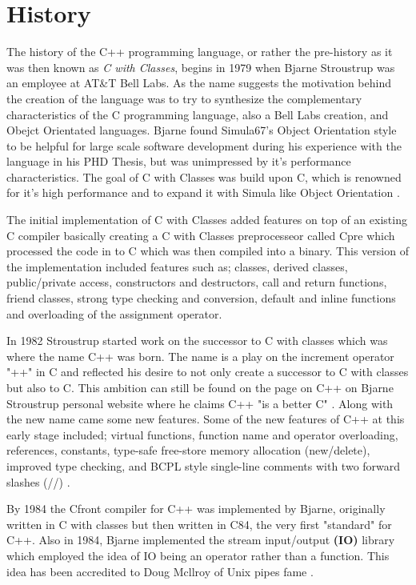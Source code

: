 \documentclass[conference, a4paper]{IEEEtran}
\begin{document}
\section{History}

The history of the C++ programming language, or rather the pre-history as it was then known as \textit{C with Classes}, begins in 1979 when Bjarne Stroustrup was an employee at AT\&T Bell Labs. As the name suggests the motivation behind the creation of the language was to try to synthesize the complementary characteristics of the C programming language, also a Bell Labs creation, and Obejct Orientated languages. Bjarne found Simula67's Object Orientation style to be helpful for large scale software development during his experience with the language in his PHD Thesis, but was unimpressed by it's performance characteristics. The goal of C with Classes was build upon C, which is renowned for it's high performance and to expand it with Simula like Object Orientation \cite{cppevolving}.

The initial implementation of C with Classes added features on top of an existing C compiler basically creating a C with Classes preprocesseor called Cpre which processed the code in to C which was then compiled into a binary. This version of the implementation included features such as; classes, derived classes, public/private access, constructors and destructors, call and return functions, friend classes, strong type checking and conversion, default and inline functions and overloading of the assignment operator. 

In 1982 Stroustrup started work on the successor to C with classes which was where the name C++ was born. The name is a play on the increment operator "++" in C and reflected his desire to not only create a successor to C with classes but also to C. This ambition can still be found on the page on C++ on Bjarne Stroustrup personal website where he claims C++ "is a better C" \cite{cpphome}. Along with the new name came some new features. Some of the new features of C++ at this early stage included; virtual functions, function name and operator overloading, references, constants, type-safe free-store memory allocation (new/delete), improved type checking, and BCPL style single-line comments with two forward slashes (//) \cite{cpphistory}. 

By 1984 the Cfront compiler for C++ was implemented by Bjarne, originally written in C with classes but then written in C84, the very first "standard" for C++. Also in 1984, Bjarne implemented the stream input/output \textbf{(IO)} library which employed the idea of IO being an operator rather than a function. This idea has been accredited to Doug Mcllroy of Unix pipes fame \cite{cpphistory}. 
\end{document}
